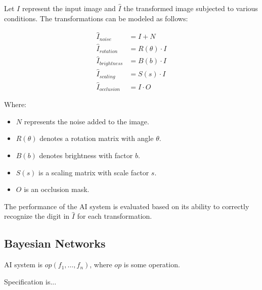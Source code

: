 \documentclass[10pt, conference, a4paper, final]{IEEEtran}
\begin{document}
Let \( I \) represent the input image and \( \hat{I} \) the transformed image subjected to various conditions. The transformations can be modeled as follows:

\begin{align}
    \hat{I}_{noise} &= I + N \\
    \hat{I}_{rotation} &= R(\theta) \cdot I \\
    \hat{I}_{brightness} &= B(b) \cdot I \\
    \hat{I}_{scaling} &= S(s) \cdot I \\
    \hat{I}_{occlusion} &= I \cdot O 
\end{align}

Where:
\begin{itemize}
    \item \( N \) represents the noise added to the image.
    \item \( R(\theta) \) denotes a rotation matrix with angle \( \theta \).
    \item \( B(b) \) denotes brightness with factor \( b \).
    \item \( S(s) \) is a scaling matrix with scale factor \( s \).
    \item \( O \) is an occlusion mask.
\end{itemize}

The performance of the AI system is evaluated based on its ability to correctly recognize the digit in \( \hat{I} \) for each transformation.

\subsection{Bayesian Networks}

AI system is $op(f_1,\dots,f_n)$, where $op$ is some operation.

Specification is...
\end{document}
